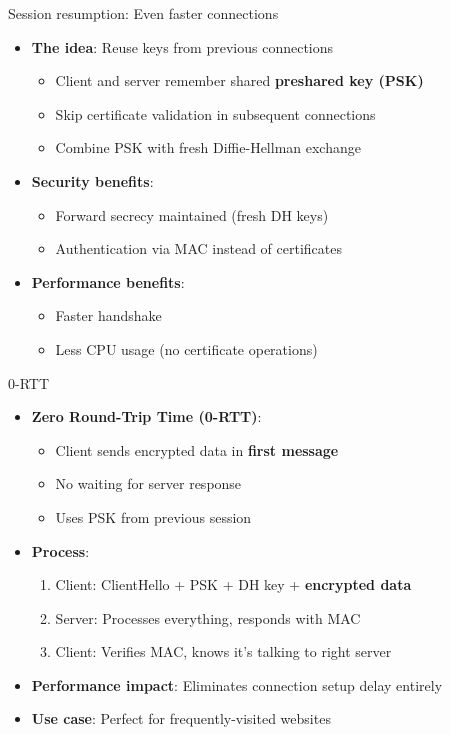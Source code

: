 \documentclass[aspectratio=169, lualatex, handout]{beamer}
\begin{document}
\begin{frame}{Session resumption: Even faster connections}
	\begin{itemize}[<+->]
		\item \textbf{The idea}: Reuse keys from previous connections
		      \begin{itemize}
			      \item Client and server remember shared \textbf{preshared key (PSK)}
			      \item Skip certificate validation in subsequent connections
			      \item Combine PSK with fresh Diffie-Hellman exchange
		      \end{itemize}
		\item \textbf{Security benefits}:
		      \begin{itemize}
			      \item Forward secrecy maintained (fresh DH keys)
			      \item Authentication via MAC instead of certificates
		      \end{itemize}
		\item \textbf{Performance benefits}:
		      \begin{itemize}
			      \item Faster handshake
			      \item Less CPU usage (no certificate operations)
		      \end{itemize}
	\end{itemize}
\end{frame}

\begin{frame}{0-RTT}
	\begin{itemize}[<+->]
		\item \textbf{Zero Round-Trip Time (0-RTT)}:
		      \begin{itemize}
			      \item Client sends encrypted data in \textbf{first message}
			      \item No waiting for server response
			      \item Uses PSK from previous session
		      \end{itemize}
		\item \textbf{Process}:
		      \begin{enumerate}
			      \item Client: ClientHello + PSK + DH key + \textbf{encrypted data}
			      \item Server: Processes everything, responds with MAC
			      \item Client: Verifies MAC, knows it's talking to right server
		      \end{enumerate}
		\item \textbf{Performance impact}: Eliminates connection setup delay entirely
		\item \textbf{Use case}: Perfect for frequently-visited websites
	\end{itemize}
\end{frame}
\end{document}

